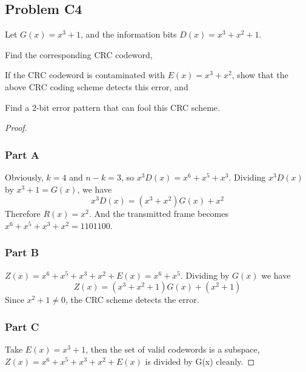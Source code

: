 \documentclass[../../../main.tex]{subfiles}
\begin{document}
\subsection{Problem C4}
\begin{wts}
    Let $G(x) = x^3 + 1$, and the information bits $D(x) = x^3 + x^2 + 1$.
    \begin{enumalpha}
        \item Find the corresponding CRC codeword,
        \item If the CRC codeword is contaminated with $E(x) = x^3 + x^2$, show that the above CRC coding scheme detects this error, and
        \item Find a 2-bit error pattern that can fool this CRC scheme.
    \end{enumalpha}
\end{wts}

\begin{proof}
\subsubsection*{Part A}
Obviously, $k=4$ and $n-k=3$, so $x^{3}D(x) = x^6 + x^5 + x^3$. Dividing $x^{3}D(x)$ by $x^3 + 1 = G(x)$, we have
\[
x^{3}D(x) = (x^3 + x^2)G(x) + x^2
\]
Therefore $R(x) = x^2$. And the transmitted frame becomes $x^6 + x^5 + x^3 + x^2 = 1101100$.
\subsubsection*{Part B}
$Z(x) = x^6 + x^5 + x^3 + x^2 + E(x) = x^6 + x^5$. Dividing by $G(x)$ we have
\[
Z(x) = (x^3 + x^2 + 1)G(x) + (x^2 + 1)
\]
Since $x^2 + 1\neq 0$, the CRC scheme detects the error.
\subsubsection*{Part C}
Take $E(x) = x^3 + 1$, then the set of valid codewords is a subspace, $Z(x) = x^6 + x^5 + x^3 + x^2 + E(x)$ is divided by G(x) cleanly.
\end{proof}
\end{document}

